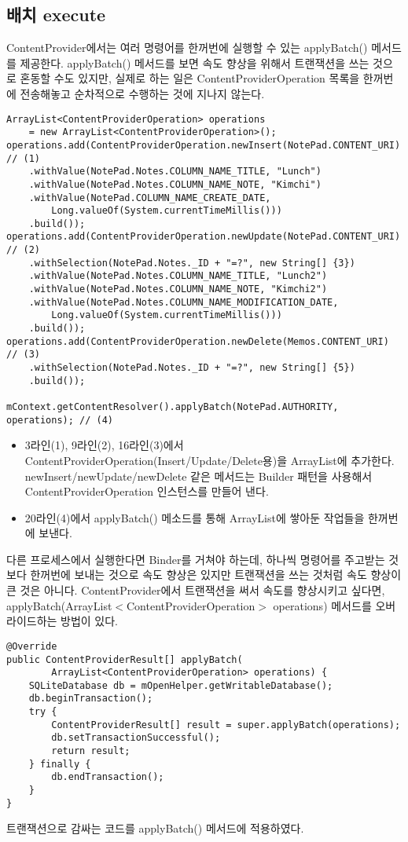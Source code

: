 \subsection{배치 execute}
ContentProvider에서는 여러 명령어를 한꺼번에 실행할 수 있는 applyBatch() 메서드를  제공한다. 
applyBatch() 메서드를 보면 속도 향상을 위해서 트랜잭션을 쓰는 것으로 혼동할 수도 있지만, 실제로 하는 일은 ContentProviderOperation 목록을 한꺼번에 전송해놓고 순차적으로 수행하는 것에 지나지 않는다. 
\begin{lstlisting}[frame=single] 
ArrayList<ContentProviderOperation> operations 
	= new ArrayList<ContentProviderOperation>();
operations.add(ContentProviderOperation.newInsert(NotePad.CONTENT_URI) // (1)
	.withValue(NotePad.Notes.COLUMN_NAME_TITLE, "Lunch")
	.withValue(NotePad.Notes.COLUMN_NAME_NOTE, "Kimchi")
	.withValue(NotePad.COLUMN_NAME_CREATE_DATE, 
		Long.valueOf(System.currentTimeMillis()))
	.build());
operations.add(ContentProviderOperation.newUpdate(NotePad.CONTENT_URI) // (2)
	.withSelection(NotePad.Notes._ID + "=?", new String[] {3})
	.withValue(NotePad.Notes.COLUMN_NAME_TITLE, "Lunch2")
	.withValue(NotePad.Notes.COLUMN_NAME_NOTE, "Kimchi2")
	.withValue(NotePad.Notes.COLUMN_NAME_MODIFICATION_DATE, 
		Long.valueOf(System.currentTimeMillis()))
	.build());
operations.add(ContentProviderOperation.newDelete(Memos.CONTENT_URI) // (3)
	.withSelection(NotePad.Notes._ID + "=?", new String[] {5})
	.build());

mContext.getContentResolver().applyBatch(NotePad.AUTHORITY, operations); // (4)
\end{lstlisting}
\begin{itemize}
\item 3라인(1), 9라인(2), 16라인(3)에서 ContentProviderOperation(Insert/Update/Delete용)을 ArrayList에 추가한다. newInsert/newUpdate/newDelete 같은 메서드는 Builder 패턴을 사용해서 ContentProviderOperation 인스턴스를 만들어 낸다.
\item 20라인(4)에서 applyBatch() 메소드를 통해 ArrayList에 쌓아둔 작업들을 한꺼번에 보낸다.
\end{itemize}

다른 프로세스에서 실행한다면 Binder를 거쳐야 하는데, 하나씩 명령어를 주고받는 것보다 한꺼번에 보내는 것으로 속도 향상은 있지만 트랜잭션을 쓰는 것처럼 속도 향상이 큰 것은 아니다.
ContentProvider에서 트랜잭션을 써서 속도를 향상시키고 싶다면,
applyBatch(ArrayList$<$ContentProviderOperation$>$ operations) 메서드를 오버라이드하는 방법이 있다.
\begin{lstlisting}[frame=single] 
@Override
public ContentProviderResult[] applyBatch(
		ArrayList<ContentProviderOperation> operations) {
	SQLiteDatabase db = mOpenHelper.getWritableDatabase();
	db.beginTransaction();
	try {
     	ContentProviderResult[] result = super.applyBatch(operations);
     	db.setTransactionSuccessful();
     	return result;
   	} finally {
     	db.endTransaction();
   	}
}
\end{lstlisting}
트랜잭션으로 감싸는 코드를 applyBatch() 메서드에 적용하였다.

